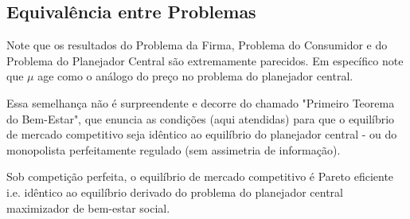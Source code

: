 \subsection{Equivalência entre Problemas}
Note que os resultados do Problema da Firma, Problema do Consumidor e do Problema do Planejador Central são extremamente parecidos. Em específico note que $\mu$ age como o análogo do preço no problema do planejador central.

Essa semelhança não é surpreendente e decorre do chamado "Primeiro Teorema do Bem-Estar", que enuncia as condições (aqui atendidas) para que o equilíbrio de mercado competitivo seja idêntico ao equilíbrio do planejador central - ou do monopolista perfeitamente regulado (sem assimetria de informação).

\begin{teo}
    Sob competição perfeita, o equilíbrio de mercado competitivo é Pareto eficiente i.e. idêntico ao equilíbrio derivado do problema do planejador central maximizador de bem-estar social.
\end{teo}

